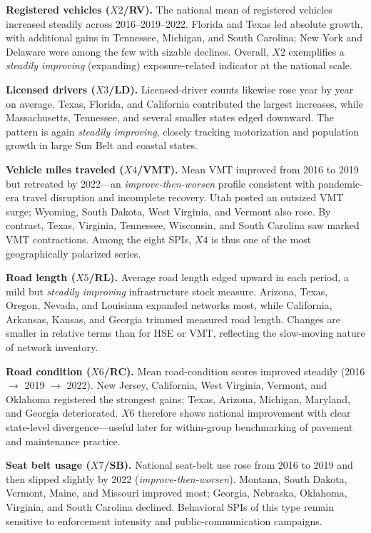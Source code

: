\documentclass{article}
\begin{document}
\textbf{Registered vehicles ($X2$/RV).} The national mean of registered vehicles increased steadily across 2016--2019--2022. Florida and Texas led absolute growth, with additional gains in Tennessee, Michigan, and South Carolina; New York and Delaware were among the few with sizable declines. Overall, $X2$ exemplifies a \emph{steadily improving} (expanding) exposure-related indicator at the national scale.

\textbf{Licensed drivers ($X3$/LD).} Licensed-driver counts likewise rose year by year on average. Texas, Florida, and California contributed the largest increases, while Massachusetts, Tennessee, and several smaller states edged downward. The pattern is again \emph{steadily improving}, closely tracking motorization and population growth in large Sun Belt and coastal states.

\textbf{Vehicle miles traveled ($X4$/VMT).} Mean VMT improved from 2016 to 2019 but retreated by 2022---an \emph{improve-then-worsen} profile consistent with pandemic-era travel disruption and incomplete recovery. Utah posted an outsized VMT surge; Wyoming, South Dakota, West Virginia, and Vermont also rose. By contrast, Texas, Virginia, Tennessee, Wisconsin, and South Carolina saw marked VMT contractions. Among the eight SPIs, $X4$ is thus one of the most geographically polarized series.

\textbf{Road length ($X5$/RL).} Average road length edged upward in each period, a mild but \emph{steadily improving} infrastructure stock measure. Arizona, Texas, Oregon, Nevada, and Louisiana expanded networks most, while California, Arkansas, Kansas, and Georgia trimmed measured road length. Changes are smaller in relative terms than for HSE or VMT, reflecting the slow-moving nature of network inventory.

\textbf{Road condition ($X6$/RC).} Mean road-condition scores improved steadily (2016 $\rightarrow$ 2019 $\rightarrow$ 2022). New Jersey, California, West Virginia, Vermont, and Oklahoma registered the strongest gains; Texas, Arizona, Michigan, Maryland, and Georgia deteriorated. $X6$ therefore shows national improvement with clear state-level divergence---useful later for within-group benchmarking of pavement and maintenance practice.

\textbf{Seat belt usage ($X7$/SB).} National seat-belt use rose from 2016 to 2019 and then slipped slightly by 2022 (\emph{improve-then-worsen}). Montana, South Dakota, Vermont, Maine, and Missouri improved most; Georgia, Nebraska, Oklahoma, Virginia, and South Carolina declined. Behavioral SPIs of this type remain sensitive to enforcement intensity and public-communication campaigns.
\end{document}
